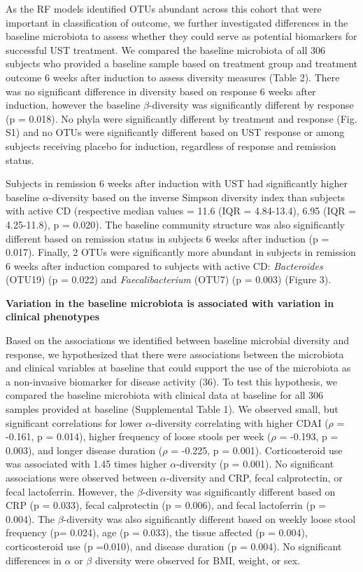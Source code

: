 \documentclass[12pt,]{article}
\begin{document}
As the RF models identified OTUs abundant across this cohort that were
important in classification of outcome, we further investigated
differences in the baseline microbiota to assess whether they could
serve as potential biomarkers for successful UST treatment. We compared
the baseline microbiota of all 306 subjects who provided a baseline
sample based on treatment group and treatment outcome 6 weeks after
induction to assess diversity measures (Table 2). There was no
significant difference in diversity based on response 6 weeks after
induction, however the baseline \({\beta}\)-diversity was significantly
different by response (p = 0.018). No phyla were significantly different
by treatment and response (Fig. S1) and no OTUs were significantly
different based on UST response or among subjects receiving placebo for
induction, regardless of response and remission status.

Subjects in remission 6 weeks after induction with UST had significantly
higher baseline \({\alpha}\)-diversity based on the inverse Simpson
diversity index than subjects with active CD (respective median values =
11.6 (IQR = 4.84-13.4), 6.95 (IQR = 4.25-11.8), p = 0.020). The baseline
community structure was also significantly different based on remission
status in subjects 6 weeks after induction (p = 0.017). Finally, 2 OTUs
were significantly more abundant in subjects in remission 6 weeks after
induction compared to subjects with active CD: \emph{Bacteroides}
(OTU19) (p = 0.022) and \emph{Faecalibacterium} (OTU7) (p = 0.003)
(Figure 3).

\textbf{Variation in the baseline microbiota is associated with
variation in clinical phenotypes}

Based on the associations we identified between baseline microbial
diversity and response, we hypothesized that there were associations
between the microbiota and clinical variables at baseline that could
support the use of the microbiota as a non-invasive biomarker for
disease activity (36). To test this hypothesis, we compared the baseline
microbiota with clinical data at baseline for all 306 samples provided
at baseline (Supplemental Table 1). We observed small, but significant
correlations for lower \({\alpha}\)-diversity correlating with higher
CDAI (\({\rho}\) = -0.161, p = 0.014), higher frequency of loose stools
per week (\({\rho}\) = -0.193, p = 0.003), and longer disease duration
(\({\rho}\) = -0.225, p = 0.001). Corticosteroid use was associated with
1.45 times higher \({\alpha}\)-diversity (p = 0.001). No significant
associations were observed between \({\alpha}\)-diversity and CRP, fecal
calprotectin, or fecal lactoferrin. However, the \({\beta}\)-diversity
was significantly different based on CRP (p = 0.033), fecal calprotectin
(p = 0.006), and fecal lactoferrin (p = 0.004). The
\({\beta}\)-diversity was also significantly different based on weekly
loose stool frequency (p= 0.024), age (p = 0.033), the tissue affected
(p = 0.004), corticosteroid use (p =0.010), and disease duration (p =
0.004). No significant differences in \({\alpha}\) or \({\beta}\)
diversity were observed for BMI, weight, or sex.
\end{document}
